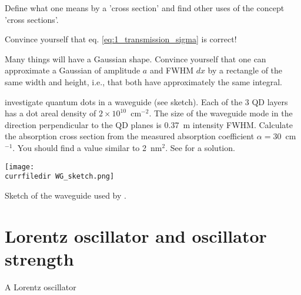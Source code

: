 \begin{questions}
  \item Define what one means by a 'cross section' and find other uses of the concept 'cross sections'.

  \item Convince yourself that eq. \ref{eq:1_transmission_sigma} is correct!
  
  \item Many things will have a Gaussian shape. Convince yourself that one can approximate a Gaussian of amplitude $a$ and FWHM $dx$ by a rectangle of the same width and height, i.e., that both have approximately the same integral.

 \item \cite{Borri:2002p139} investigate  quantum dots in a waveguide (see sketch). Each of the 3 QD layers has a dot areal density of $2 \times 10^{10}$~cm$^{-2}$. The size of the waveguide mode in the direction perpendicular to the QD planes is 0.37~\textmu m intensity FWHM. Calculate the absorption cross section from the measured absorption coefficient $\alpha = 30$~cm$^{-1}$. You should find a value similar to 2~nm$^2$. See  for a solution. \label{qu:2_borri_wg}
\end{questions}
  
\begin{marginfigure}
  \texttt{[image: \\currfiledir WG\_sketch.png]}
  \caption{Sketch of the waveguide used by \cite{Borri:2002p139}. }
\end{marginfigure}




\section{Lorentz oscillator and oscillator strength}


\begin{marginfigure}
\caption{A Lorentz oscillator}
\end{marginfigure}


